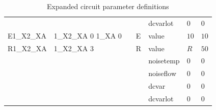 \begin{table}[h]
\begin{tabular}[c]{lllllll}
\rowcolor{myyellow}
 & & & &\small{dcvarlot} &$0$ &$0$ \\ 
\small{E1\_X2\_XA} &\small{1\_X2\_XA 0 1\_XA 0 } & &\small{E} &\small{value} &$10$ &$10$ \\ 
\rowcolor{myyellow}
\small{R1\_X2\_XA} &\small{1\_X2\_XA 3 } & &\small{R} &\small{value} &$R$ &$50$ \\ 
 & & & &\small{noisetemp} &$0$ &$0$ \\ 
\rowcolor{myyellow}
 & & & &\small{noiseflow} &$0$ &$0$ \\ 
 & & & &\small{dcvar} &$0$ &$0$ \\ 
\rowcolor{myyellow}
 & & & &\small{dcvarlot} &$0$ &$0$ \\ 
\end{tabular}
\caption{Expanded circuit parameter definitions}
\end{table}

